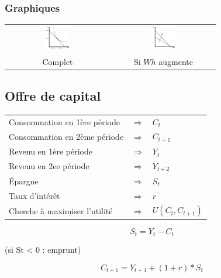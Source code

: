 \subsubsection{Graphiques}



\begin{center}
	\begin{tabular}{cc}
		\includegraphics[width=0.25\textwidth]{images/graph_offre_de_travail.pdf} & \includegraphics[width=0.25\textwidth]{images/graph_offre_de_travail_wh_augmente.pdf}\\
		Complet                                                                   & Si $Wh$ augmente
	\end{tabular}
\end{center}


\newpage
\subsection{Offre de capital}



\begin{tabular}{lll}
	Consommation en 1ère période  & $\Rightarrow$ & $C_t$\\
	Consommation en 2ème période  & $\Rightarrow$ & $C_{t+1}$\\
	Revenu en 1ère période        & $\Rightarrow$ & $Y_t$\\
	Revenu en 2ee période         & $\Rightarrow$ & $Y_{t+2}$\\
	Épargne                       & $\Rightarrow$ & $S_t$\\
	Taux d'intérêt                & $\Rightarrow$ & $r$\\
	Cherche à maximiser l'utilité & $\Rightarrow$ & $U(C_t,C_{t+1})$
\end{tabular}
$$S_t = Y_t - C_t$$
\begin{flushright}
	(si St < 0 : emprunt)
\end{flushright}
$$C_{t+1} = Y_{t+1} + ( 1 + r ) * S_t $$



